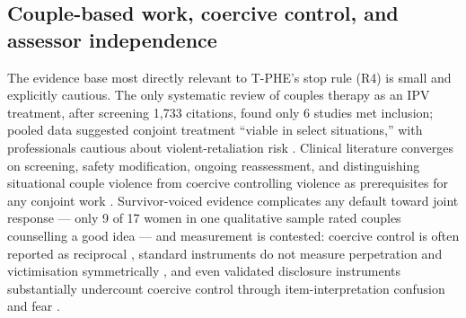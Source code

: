 \documentclass[11pt]{article}
\newcommand{\tphe}{T\mbox{-}PHE}
\begin{document}
\subsection{Couple-based work, coercive control, and assessor independence}
The evidence base most directly relevant to \tphe{}'s stop rule (R4) is small and explicitly cautious. The only systematic review of couples therapy as an IPV treatment, after screening 1{,}733 citations, found only 6 studies met inclusion; pooled data suggested conjoint treatment ``viable in select situations,'' with professionals cautious about violent-retaliation risk \cite{ref45}. Clinical literature converges on screening, safety modification, ongoing reassessment, and distinguishing situational couple violence from coercive controlling violence as prerequisites for any conjoint work \cite{ref46,ref47}. Survivor-voiced evidence complicates any default toward joint response --- only 9 of 17 women in one qualitative sample rated couples counselling a good idea \cite{ref48} --- and measurement is contested: coercive control is often reported as reciprocal \cite{ref49}, standard instruments do not measure perpetration and victimisation symmetrically \cite{ref50}, and even validated disclosure instruments substantially undercount coercive control through item-interpretation confusion and fear \cite{ref51}.
\end{document}
